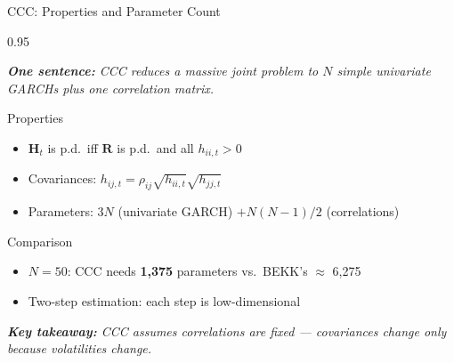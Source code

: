 \documentclass[9pt, aspectratio=169, t]{beamer}
\begin{document}
\begin{frame}{CCC: Properties and Parameter Count}
    \begin{cminipage}{0.95\textwidth}
    {\footnotesize
    \textit{\textbf{One sentence:} CCC reduces a massive joint problem to $N$ simple univariate GARCHs plus one correlation matrix.}
    \vspace{0.2cm}
    \begin{block}{Properties}
        \begin{itemize}\setlength{\itemsep}{2pt}
            \item $\mathbf{H}_t$ is p.d.\ iff $\mathbf{R}$ is p.d.\ and all $h_{ii,t} > 0$
            \item Covariances: $h_{ij,t} = \rho_{ij}\sqrt{h_{ii,t}}\sqrt{h_{jj,t}}$
            \item Parameters: $3N$ (univariate GARCH) $+ N(N-1)/2$ (correlations)
        \end{itemize}
    \end{block}
    \vspace{0.1cm}
    \begin{alertblock}{Comparison}
        \begin{itemize}\setlength{\itemsep}{0pt}
            \item $N = 50$: CCC needs \textbf{1,375} parameters vs.\ BEKK's $\approx$ 6,275
            \item Two-step estimation: each step is low-dimensional
        \end{itemize}
    \end{alertblock}
    \vspace{0.2cm}
    \textit{\textbf{Key takeaway:} CCC assumes correlations are fixed --- covariances change only because volatilities change.}
    }
    \end{cminipage}
\end{frame}
\end{document}

